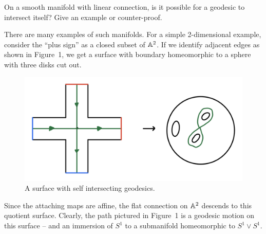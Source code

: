 \documentclass{../../templates/lkx_pset}
\begin{document}
\begin{problem}{10}
  On a smooth manifold with linear connection, is it possible for a geodesic to intersect itself? Give an example or counter-proof.
\end{problem}
\begin{solution}
  There are many examples of such manifolds. For a simple 2-dimensional example, consider the ``plus sign'' as a closed subset of $\mathbb{A}^2$. If we identify adjacent edges as shown in Figure~1, we get a surface with boundary homeomorphic to a sphere with three disks cut out. 
  \begin{figure}[ht]
    \centering
    \includegraphics[scale=0.3]{problem10.png}
    \caption{A surface with self intersecting geodesics.}
  \end{figure}
  Since the attaching maps are affine, the flat connection on $\mathbb{A}^2$ descends to this quotient surface. Clearly, the path pictured in Figure~1 is a geodesic motion on this surface -- and an immersion of $S^1$ to a submanifold homeomorphic to $S^1\vee S^1$.
\end{solution}
\end{document}
